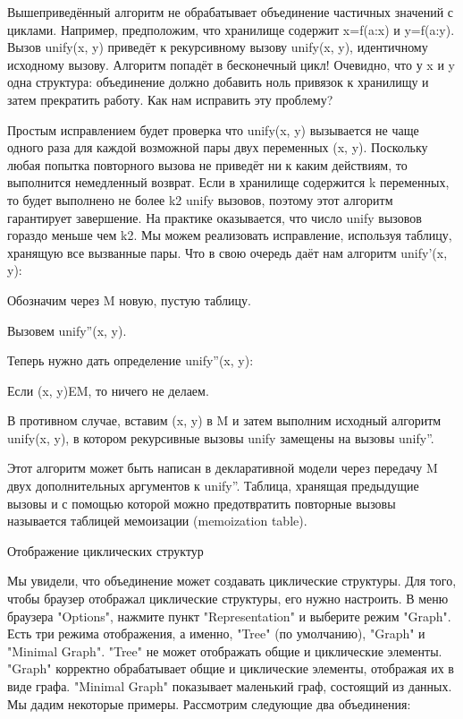 Вышеприведённый алгоритм не обрабатывает объединение частичных значений с циклами. Например, предположим, что хранилище содержит x=f(a:x) и y=f(a:y). Вызов unify(x, y) приведёт к рекурсивному вызову unify(x, y), идентичному исходному вызову. Алгоритм попадёт в бесконечный цикл! Очевидно, что у x и y одна структура: объединение должно добавить ноль привязок к хранилищу и затем прекратить работу. Как нам исправить эту проблему?

Простым исправлением будет проверка что unify(x, y) вызывается не чаще одного раза для каждой возможной пары двух переменных (x, y). Поскольку любая попытка повторного вызова не приведёт ни к каким действиям, то выполнится немедленный возврат. Если в хранилище содержится k переменных, то будет выполнено не более k2 unify вызовов, поэтому этот алгоритм гарантирует завершение. На практике оказывается, что число unify вызовов гораздо меньше чем k2. Мы можем реализовать исправление, используя таблицу, хранящую все вызванные пары. Что в свою очередь даёт нам алгоритм unify'(x, y):

Обозначим через M новую, пустую таблицу.

Вызовем unify''(x, y).

Теперь нужно дать определение unify''(x, y):

Если (x, y)EM, то ничего не делаем.

В противном случае, вставим (x, y) в M и затем выполним исходный алгоритм unify(x, y), в котором рекурсивные вызовы unify замещены на вызовы unify''.

Этот алгоритм может быть написан в декларативной модели через передачу M двух дополнительных аргументов к unify''. Таблица, хранящая предыдущие вызовы и с помощью которой можно предотвратить повторные вызовы называется таблицей мемоизации (memoization table).

Отображение циклических структур

Мы увидели, что объединение может создавать циклические структуры. Для того, чтобы браузер отображал циклические структуры, его нужно настроить. В меню браузера "Options", нажмите пункт "Representation" и выберите режим "Graph". Есть три режима отображения, а именно, "Tree" (по умолчанию), "Graph" и "Minimal Graph". "Tree" не может отображать общие и циклические элементы. "Graph" корректно обрабатывает общие и циклические элементы, отображая их в виде графа. "Minimal Graph" показывает маленький граф, состоящий из данных. Мы дадим некоторые примеры. Рассмотрим следующие два объединения:


